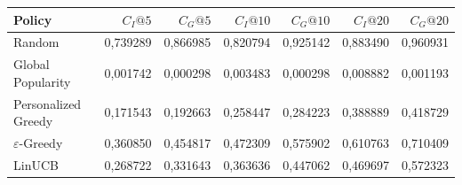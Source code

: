 \begin{tabular}{lrrrrrr}
\toprule
Policy & $C_I@5$ & $C_G@5$ & $C_I@10$ & $C_G@10$ & $C_I@20$ & $C_G@20$ \\
\midrule
Random & 0,739289 & 0,866985 & 0,820794 & 0,925142 & 0,883490 & 0,960931 \\
Global Popularity & 0,001742 & 0,000298 & 0,003483 & 0,000298 & 0,008882 & 0,001193 \\
Personalized Greedy & 0,171543 & 0,192663 & 0,258447 & 0,284223 & 0,388889 & 0,418729 \\
$\varepsilon$-Greedy & 0,360850 & 0,454817 & 0,472309 & 0,575902 & 0,610763 & 0,710409 \\
LinUCB & 0,268722 & 0,331643 & 0,363636 & 0,447062 & 0,469697 & 0,572323 \\
\bottomrule
\end{tabular}
